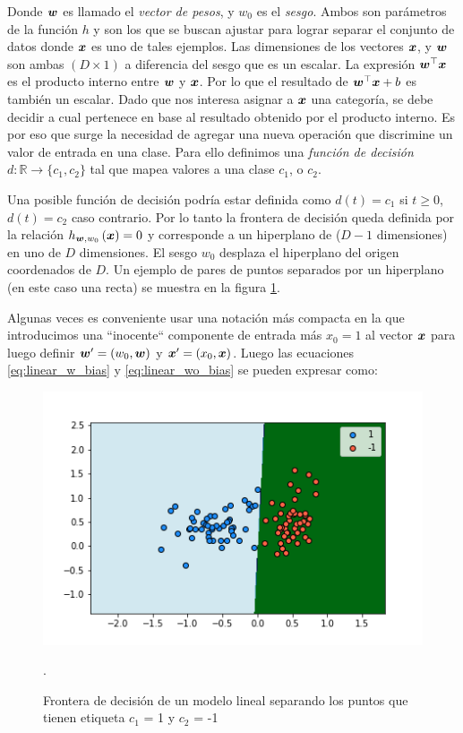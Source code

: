 Donde $\boldsymbol{w}$ es llamado el \emph{vector de pesos}, y $w_0$ es el
\emph{sesgo}. Ambos son parámetros de la función $h$ y son los que se buscan
ajustar para lograr separar el conjunto de datos donde $\boldsymbol{x}$ es uno de tales
ejemplos. Las dimensiones de los vectores $\boldsymbol{x}$, y $\boldsymbol{w}$ son ambas $(D
\times 1)$ a diferencia del sesgo que es un escalar. La expresión
$\boldsymbol{w}^{\top} \boldsymbol{x}$ es el producto interno entre $\boldsymbol{w}$ y $\boldsymbol{x}$.
Por lo que el resultado de $\boldsymbol{w}^{\top} \boldsymbol{x} + b$ es también un escalar.
Dado que nos interesa asignar a $\boldsymbol{x}$ una categoría, se debe decidir a cual
pertenece en base al resultado obtenido por el producto interno. Es por eso que
surge la necesidad de agregar una nueva operación que discrimine un valor de
entrada en una clase. Para ello definimos una \emph{función de decisión} $d: \mathbb{R} \rightarrow
\{c_1, c_2\}$ tal que mapea valores a una clase $c_1$, o $c_2$.

Una posible función de decisión podría estar definida como $d(t) = c_1$ si $t
\geq 0$, $d(t) = c_2$ caso contrario. Por lo tanto la frontera de decisión queda
definida por la relación $h_{\boldsymbol{w}, w_0}\left( \boldsymbol{x} \right) = 0$ y
corresponde a un hiperplano de ($D-1$ dimensiones) en uno de $D$ dimensiones. El
sesgo $w_0$ desplaza el hiperplano del origen coordenados de $D$. Un ejemplo de pares de puntos separados por un hiperplano (en este caso una recta) se muestra en la figura \ref{fig:linear_model_boundary}.

Algunas veces es conveniente usar una notación más compacta en la que
introducimos una ``inocente`` componente de entrada más $x_0 = 1$ al vector
$\boldsymbol{x}$ para luego definir $\boldsymbol{w}' = (w_0, \boldsymbol{w})$ y $\boldsymbol{x}' = (x_0,
\boldsymbol{x})$. Luego las ecuaciones \ref{eq:linear_w_bias} y \ref{eq:linear_wo_bias}
se pueden expresar como:

\begin{figure}
    \centering
    \includegraphics[scale=0.5]{figures/decision_boundary.png}
    \caption{Frontera de decisión de un modelo lineal separando los puntos que tienen etiqueta $c_1$ = 1 y $c_2$ = -1}.
    \label{fig:linear_model_boundary}
\end{figure}


